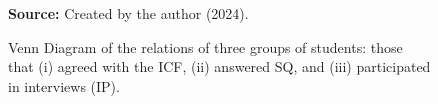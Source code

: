 \begin{figure}[ht!]
\centering

\caption{\textmd{Venn Diagram of the relations of three groups of students: those that (i) agreed with the \acrfull{ICF}, (ii) answered \acrfull{SQ}, and (iii) participated in interviews (\acrshort{IP}).}}
\label{fig:participation-venn}

\par\medskip\ABNTEXfontereduzida\selectfont\textbf{Source:} Created by the author (2024).%
\end{figure}

                

        

